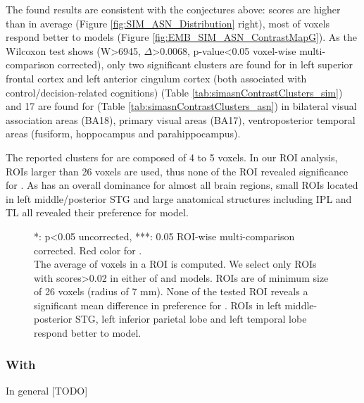 The found results are consistent with the conjectures above:  scores are higher than  in average (Figure \ref{fig:SIM_ASN_Distribution} right), most of voxels respond better to  models (Figure \ref{fig:EMB_SIM_ASN_ContrastMapG}). As the Wilcoxon test shows (W>6945, \(\Delta\)>0.0068, p-value<0.05 voxel-wise multi-comparison corrected), only two significant clusters are found for  in left superior frontal cortex and left anterior cingulum cortex (both associated with control/decision-related cognitions) (Table \ref{tab:simasnContrastClusters_sim}) and 17 are found for  (Table \ref{tab:simasnContrastClusters_asn}) in bilateral visual association areas (BA18), primary visual areas (BA17), ventroposterior temporal areas (fusiform, hoppocampus and parahippocampus). 

The reported clusters for  are composed of 4 to 5 voxels. In our ROI analysis, ROIs larger than 26 voxels are used, thus none of the ROI revealed significance for . As  has an overall dominance for almost all brain regions, small ROIs located in left middle/posterior STG and large anatomical structures including IPL and TL all revealed their preference for  model. 

\begin{figure}
    \centering
    \caption[- ROI Contrast, Group]{*: p<0.05 uncorrected, ***: 0.05 ROI-wise multi-comparison corrected. Red color for .\\ The average  of voxels in a ROI is computed. We select only ROIs with scores>0.02 in either of  and  models. ROIs are of minimum size of 26 voxels (radius of 7 mm). None of the tested ROI reveals a significant mean difference in preference for . ROIs in left middle-posterior STG, left inferior parietal lobe and left temporal lobe respond better to  model.} 
    \label{fig:SIM_ASN_ROI}
\end{figure}

\subsubsection{With }

In general  [TODO]
